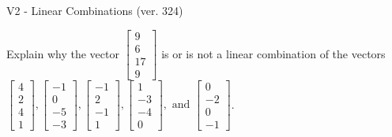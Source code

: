 \begin{exercise}
  \begin{exerciseTitle}V2 - Linear Combinations (ver. 324)\end{exerciseTitle}
  \begin{exerciseStatement}
    Explain why the vector \(\left[\begin{array}{c}
9 \\
6 \\
17 \\
9
\end{array}\right]\)  is or is not a linear 
	combination of the vectors \(\left[\begin{array}{c}
4 \\
2 \\
4 \\
1
\end{array}\right] , \left[\begin{array}{c}
-1 \\
0 \\
-5 \\
-3
\end{array}\right] , \left[\begin{array}{c}
-1 \\
2 \\
-1 \\
1
\end{array}\right] , \left[\begin{array}{c}
1 \\
-3 \\
-4 \\
0
\end{array}\right] , \text{ and } \left[\begin{array}{c}
0 \\
-2 \\
0 \\
-1
\end{array}\right]\).
	



\end{exerciseStatement}
\end{exercise}
